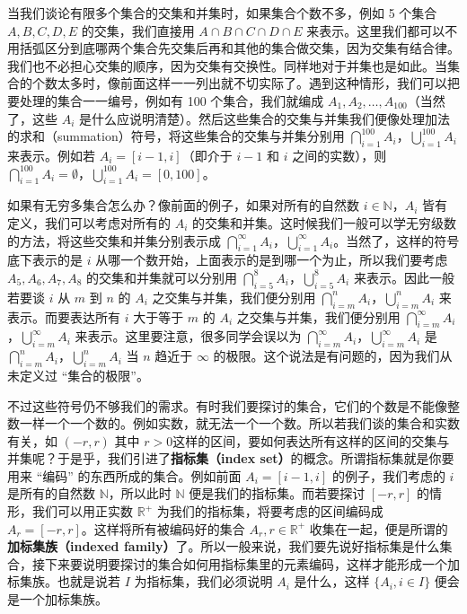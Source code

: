 当我们谈论有限多个集合的交集和并集时，如果集合个数不多，例如 5 个集合 $A, B, C, D, E$ 的交集，我们直接用 $A \cap B \cap C \cap D \cap E$ 来表示。这里我们都可以不用括弧区分到底哪两个集合先交集后再和其他的集合做交集，因为交集有结合律。我们也不必担心交集的顺序，因为交集有交换性。同样地对于并集也是如此。当集合的个数太多时，像前面这样一一列出就不切实际了。遇到这种情形，我们可以把要处理的集合一一编号，例如有 100 个集合，我们就编成 $A_1, A_2, \dots, A_{100}$（当然了，这些 $A_i$ 是什么应说明清楚）。然后这些集合的交集与并集我们便像处理加法的求和（summation）符号，将这些集合的交集与并集分别用 $\bigcap_{i=1}^{100} A_i$，$\bigcup_{i=1}^{100} A_i$ 来表示。例如若 $A_i = [i-1, i]$（即介于 $i-1$ 和 $i$ 之间的实数），则 $\bigcap_{i=1}^{100} A_i = \emptyset$，$\bigcup_{i=1}^{100} A_i = [0, 100]$。

如果有无穷多集合怎么办？像前面的例子，如果对所有的自然数 $i \in \mathbb{N}$，$A_i$ 皆有定义，我们可以考虑对所有的 $A_i$ 的交集和并集。这时候我们一般可以学无穷级数的方法，将这些交集和并集分别表示成 $\bigcap_{i=1}^{\infty} A_i$，$\bigcup_{i=1}^{\infty} A_i$。当然了，这样的符号底下表示的是 $i$ 从哪一个数开始，上面表示的是到哪一个为止，所以我们要考虑 $A_5, A_6, A_7, A_8$ 的交集和并集就可以分别用 $\bigcap_{i=5}^{8} A_i$，$\bigcup_{i=5}^{8} A_i$ 来表示。因此一般若要谈 $i$ 从 $m$ 到 $n$ 的 $A_i$ 之交集与并集，我们便分别用 $\bigcap_{i=m}^{n} A_i$，$\bigcup_{i=m}^{n} A_i$ 来表示。而要表达所有 $i$ 大于等于 $m$ 的 $A_i$ 之交集与并集，我们便分别用 $\bigcap_{i=m}^{\infty} A_i$，$\bigcup_{i=m}^{\infty} A_i$ 来表示。这里要注意，很多同学会误以为 $\bigcap_{i=m}^{\infty} A_i$，$\bigcup_{i=m}^{\infty} A_i$ 是 $\bigcap_{i=m}^{n} A_i$，$\bigcup_{i=m}^{n} A_i$ 当 $n$ 趋近于 $\infty$ 的极限。这个说法是有问题的，因为我们从未定义过 “集合的极限”。

不过这些符号仍不够我们的需求。有时我们要探讨的集合，它们的个数是不能像整数一样一个一个数的。例如实数，就无法一个一个数。所以若我们谈的集合和实数有关，如 $(-r, r)$ 其中 $r > 0$这样的区间，要如何表达所有这样的区间的交集与并集呢？于是乎，我们引进了\textbf{指标集（index set）}的概念。所谓指标集就是你要用来 “编码” 的东西所成的集合。例如前面 $A_i = [i-1, i]$ 的例子，我们考虑的 $i$ 是所有的自然数 $\mathbb{N}$，所以此时 $\mathbb{N}$ 便是我们的指标集。而若要探讨 $[-r, r]$ 的情形，我们可以用正实数 $\mathbb{R}^+$ 为我们的指标集，将要考虑的区间编码成 $A_r = [-r, r]$。这样将所有被编码好的集合 $A_r, r \in \mathbb{R}^+$ 收集在一起，便是所谓的\textbf{加标集族（indexed family）}了。所以一般来说，我们要先说好指标集是什么集合，接下来要说明要探讨的集合如何用指标集里的元素编码，这样才能形成一个加标集族。也就是说若 $I$ 为指标集，我们必须说明 $A_i$ 是什么，这样 $\{A_i, i \in I\}$ 便会是一个加标集族。

